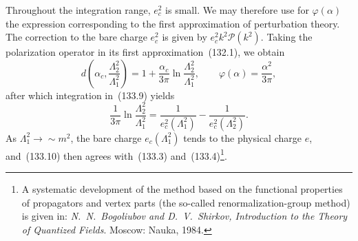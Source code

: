 Throughout the integration range, $e_c^2$ is small. We may therefore use for $\varphi(\alpha)$ the expression corresponding to the first approximation of perturbation theory. The correction to the bare charge $e_c^2$ is given by $e_c^2k^2\mathcal P(k^2)$. Taking the polarization operator in its first approximation~(132.1), we obtain
\[
d\left(\alpha_c,\frac{\Lambda_2^2}{\Lambda_1^2}\right)=1+\frac{\alpha_c}{3\pi}\ln\frac{\Lambda_2^2}{\Lambda_1^2},\qquad \varphi(\alpha)=\frac{\alpha^2}{3\pi},
\]
after which integration in~(133.9) yields
\begin{equation}
\frac{1}{3\pi}\ln\frac{\Lambda_2^2}{\Lambda_1^2}=\frac{1}{e_c^2(\Lambda_1^2)}-\frac{1}{e_c^2(\Lambda_2^2)}.
\tag{133.10}
\end{equation}
As $\Lambda_1^2\to\sim m^2$, the bare charge $e_c(\Lambda_1^2)$ tends to the physical charge $e$, and~(133.10) then agrees with~(133.3) and~(133.4)\footnote{A systematic development of the method based on the functional properties of propagators and vertex parts (the so-called renormalization-group method) is given in: \emph{N.~N.~Bogoliubov and D.~V.~Shirkov, Introduction to the Theory of Quantized Fields}. Moscow: Nauka, 1984.}.
